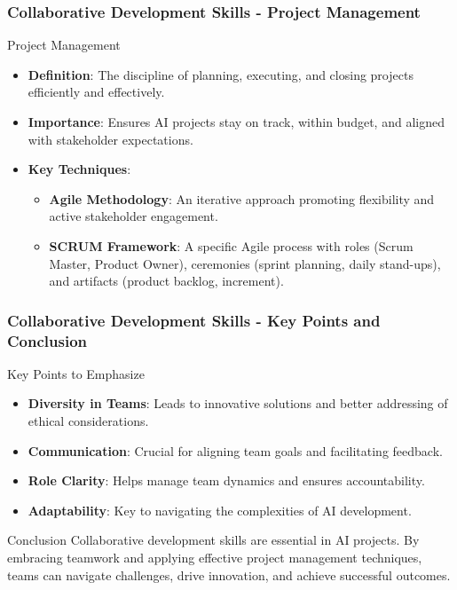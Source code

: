 \documentclass[aspectratio=169]{beamer}
\begin{document}
\begin{frame}[fragile]
    \frametitle{Collaborative Development Skills - Project Management}
    \begin{block}{Project Management}
        \begin{itemize}
            \item \textbf{Definition}: The discipline of planning, executing, and closing projects efficiently and effectively.
            \item \textbf{Importance}: Ensures AI projects stay on track, within budget, and aligned with stakeholder expectations.
            \item \textbf{Key Techniques}:
            \begin{itemize}
                \item \textbf{Agile Methodology}: An iterative approach promoting flexibility and active stakeholder engagement.
                \item \textbf{SCRUM Framework}: A specific Agile process with roles (Scrum Master, Product Owner), ceremonies (sprint planning, daily stand-ups), and artifacts (product backlog, increment).
            \end{itemize}
        \end{itemize}
    \end{block}
\end{frame}

\begin{frame}[fragile]
    \frametitle{Collaborative Development Skills - Key Points and Conclusion}
    \begin{block}{Key Points to Emphasize}
        \begin{itemize}
            \item \textbf{Diversity in Teams}: Leads to innovative solutions and better addressing of ethical considerations.
            \item \textbf{Communication}: Crucial for aligning team goals and facilitating feedback.
            \item \textbf{Role Clarity}: Helps manage team dynamics and ensures accountability.
            \item \textbf{Adaptability}: Key to navigating the complexities of AI development.
        \end{itemize}
    \end{block}

    \begin{block}{Conclusion}
        Collaborative development skills are essential in AI projects. By embracing teamwork and applying effective project management techniques, teams can navigate challenges, drive innovation, and achieve successful outcomes.
    \end{block}
\end{frame}
\end{document}

